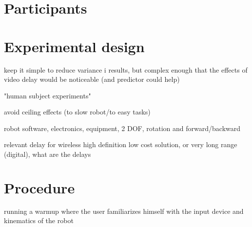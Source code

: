
\section{Participants}

\section{Experimental design}

keep it simple to reduce variance i results, but complex enough that the effects of video delay would be noticeable (and predictor could help)

"human subject experiments"

avoid ceiling effects (to slow robot/to easy tasks)

robot software, electronics, equipment, 2 DOF, rotation and forward/backward

relevant delay for wireless high definition low cost solution, or very long range (digital), what are the delays


\section{Procedure}

running a warmup where the user familiarizes himself with the input device and kinematics of the robot

